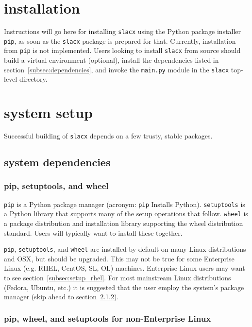 \chapter{installation}
\label{ch:installation}

Instructions will go here for installing \verb|slacx| using 
the Python package installer \verb|pip|,
as soon as the \verb|slacx| package is prepared for that.
Currently, installation from \verb|pip| is not implemented.
Users looking to install \verb|slacx| from source
should build a virtual environment (optional),
install the dependencies listed in section~\ref{subsec:dependencies},
and invoke the \verb|main.py| module in the \verb|slacx| top-level directory.


\chapter{system setup}
\label{ch:system_setup}
\lstset{language=Bash}

Successful building of \verb|slacx| depends on a few trusty, stable packages.

\section{system dependencies}

\subsection{pip, setuptools, and wheel}

\verb|pip| is a Python package manager
(acronym: \verb|pip| Installs Python). 
\verb|setuptools| is a Python library that supports
many of the setup operations that follow.
\verb|wheel| is a package distribution and installation library 
supporting the wheel distribution standard. 
Users will typically want to install these together.

\verb|pip|, \verb|setuptools|, and \verb|wheel| are installed by default 
on many Linux distributions and OSX, but should be upgraded.
This may not be true for some Enterprise Linux (e.g. RHEL, CentOS, SL, OL) machines.
Enterprise Linux users may want to see section~\ref{subsec:setup_rhel}.
For most mainstream Linux distributions (Fedora, Ubuntu, etc.)
it is suggested that the user employ the system's package manager 
(skip ahead to section~\ref{subsec:setup_non-enterprise}).

\subsection{pip, wheel, and setuptools for non-Enterprise Linux}
\label{subsec:setup_non-enterprise}


